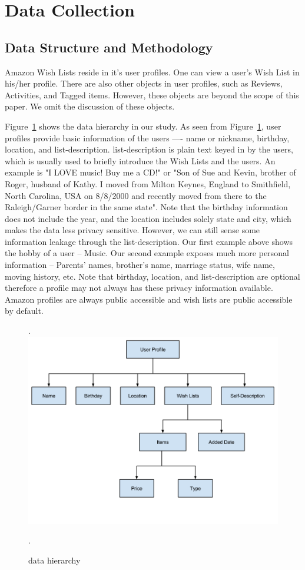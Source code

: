 \documentclass{llncs}
\begin{document}
\section{Data Collection}
\subsection{Data Structure and Methodology}
Amazon Wish Lists reside in it's user profiles. One can view a user's Wish List in his/her profile. There are also other objects in user profiles, such as Reviews, Activities, and Tagged items. However, these objects are beyond the scope of this paper. We omit the discussion of these objects. 

Figure~\ref{data_struct} shows the data hierarchy in our study. As seen from Figure~\ref{data_struct}, user profiles provide basic information of the users —- name or nickname, birthday, location, and list-description. list-description is plain text keyed in by the users, which is usually used to briefly introduce the Wish Lists and the users. An example is "I LOVE music! Buy me a CD!" or "Son of Sue and Kevin, brother of Roger, husband of Kathy. I moved from Milton Keynes, England to Smithfield, North Carolina, USA on 8/8/2000 and recently moved from there to the Raleigh/Garner border in the same state". Note that the birthday information does not include the year, and the location includes solely state and city, which makes the data less privacy sensitive. However, we can still sense some information leakage through the list-description. Our first example above shows the hobby of a user -- Music. Our second example exposes much more personal information -- Parents' names, brother's name, marriage status, wife name, moving history, etc. Note that birthday, location, and list-description are optional therefore a profile may not always has these privacy information available. Amazon profiles are always public accessible and wish lists are public accessible by default. 
\begin{figure}[H].
\centering
\includegraphics[width=.75\textwidth]{data_struct.png}
\caption{data hierarchy}.
\label{data_struct}
\end{figure}
\end{document}
